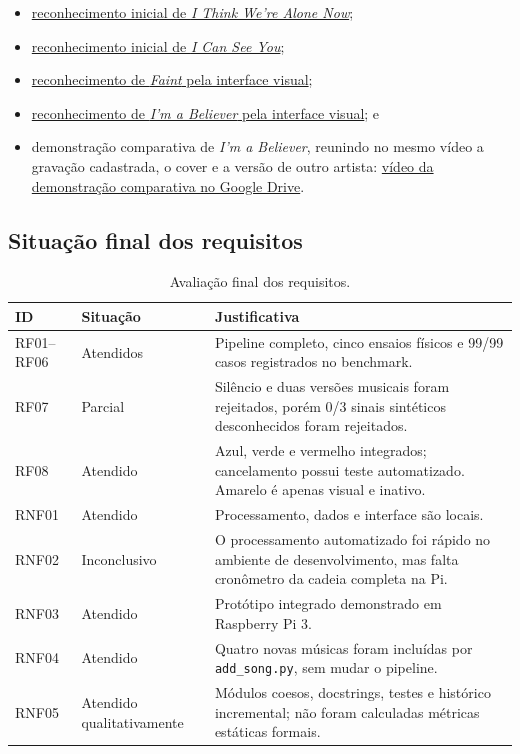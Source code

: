 \documentclass[12pt,a4paper]{article}
\newcommand{\codigo}[1]{\texttt{#1}}
\newcommand{\VideoFinalURL}{\href{https://drive.google.com/file/d/1d5mtTm5FeTt85H9Ikr7ll8yA03pNou9N/view?usp=drive_link}{vídeo da demonstração comparativa no Google Drive}}
\begin{document}
\begin{itemize}
    \item \href{https://drive.google.com/file/d/1WVeXX_BBBwl9FQLqkDflyXSvk02ixFJV/view?usp=drive_link}{reconhecimento inicial de \emph{I Think We're Alone Now}};
    \item \href{https://drive.google.com/file/d/1dMfCgbtVWppEejYeSiKkwlpFuSDm9pZl/view?usp=drive_link}{reconhecimento inicial de \emph{I Can See You}};
    \item \href{https://drive.google.com/file/d/1rLpTn6fKmtMdpTGRO0p9CcuUjlkBJj4Z/view?usp=sharing}{reconhecimento de \emph{Faint} pela interface visual};
    \item \href{https://drive.google.com/file/d/1J5bIVzYEBFFINbpdiOmMa_muk8vZdySW/view?usp=sharing}{reconhecimento de \emph{I'm a Believer} pela interface visual}; e
    \item demonstração comparativa de \emph{I'm a Believer}, reunindo no mesmo
    vídeo a gravação cadastrada, o cover e a versão de outro artista:
    \VideoFinalURL.
\end{itemize}

\subsection{Situação final dos requisitos}

\begin{table}[H]
    \centering
    \caption{Avaliação final dos requisitos.}
    \label{tab:status}
    \small
    \begin{tabularx}{\textwidth}{p{1.4cm} p{2.5cm} Y}
        \toprule
        \textbf{ID} & \textbf{Situação} & \textbf{Justificativa}\\
        \midrule
        RF01--RF06 & Atendidos & Pipeline completo, cinco ensaios físicos e
        99/99 casos registrados no benchmark.\\
        RF07 & Parcial & Silêncio e duas versões musicais foram rejeitados,
        porém 0/3 sinais sintéticos desconhecidos foram rejeitados.\\
        RF08 & Atendido & Azul, verde e vermelho integrados; cancelamento possui
        teste automatizado. Amarelo é apenas visual e inativo.\\
        RNF01 & Atendido & Processamento, dados e interface são locais.\\
        RNF02 & Inconclusivo & O processamento automatizado foi rápido no ambiente
        de desenvolvimento, mas falta cronômetro da cadeia completa na Pi.\\
        RNF03 & Atendido & Protótipo integrado demonstrado em Raspberry Pi 3.\\
        RNF04 & Atendido & Quatro novas músicas foram incluídas por
        \codigo{add\_song.py}, sem mudar o pipeline.\\
        RNF05 & Atendido qualitativamente & Módulos coesos, docstrings, testes e
        histórico incremental; não foram calculadas métricas estáticas formais.\\
        \bottomrule
    \end{tabularx}
\end{table}
\end{document}
